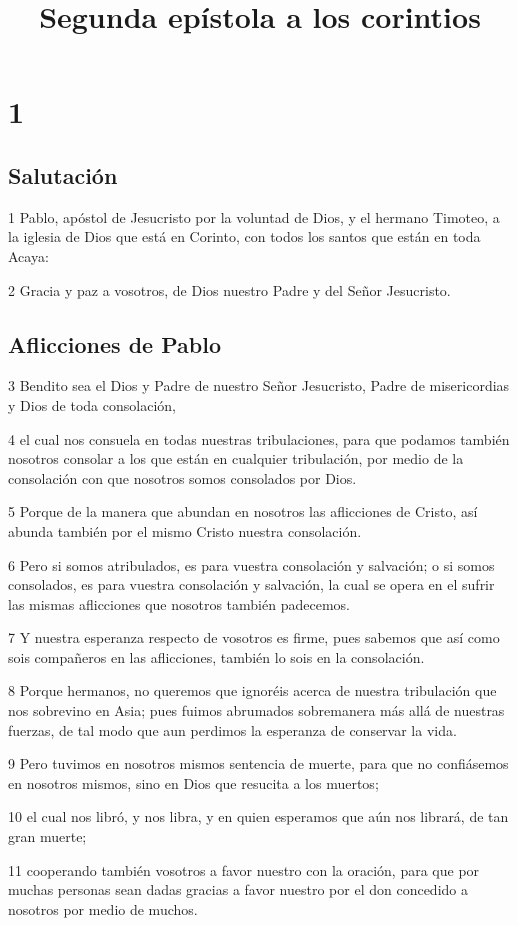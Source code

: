 
\title{Segunda epístola a los corintios}

\chapter{1}

\section*{Salutación}

\par 1 Pablo, apóstol de Jesucristo por la voluntad de Dios, y el hermano Timoteo, a la iglesia de Dios que está en Corinto, con todos los santos que están en toda Acaya:
\par 2 Gracia y paz a vosotros, de Dios nuestro Padre y del Señor Jesucristo.

\section*{Aflicciones de Pablo}

\par 3 Bendito sea el Dios y Padre de nuestro Señor Jesucristo, Padre de misericordias y Dios de toda consolación,
\par 4 el cual nos consuela en todas nuestras tribulaciones, para que podamos también nosotros consolar a los que están en cualquier tribulación, por medio de la consolación con que nosotros somos consolados por Dios.
\par 5 Porque de la manera que abundan en nosotros las aflicciones de Cristo, así abunda también por el mismo Cristo nuestra consolación.
\par 6 Pero si somos atribulados, es para vuestra consolación y salvación; o si somos consolados, es para vuestra consolación y salvación, la cual se opera en el sufrir las mismas aflicciones que nosotros también padecemos.
\par 7 Y nuestra esperanza respecto de vosotros es firme, pues sabemos que así como sois compañeros en las aflicciones, también lo sois en la consolación.
\par 8 Porque hermanos, no queremos que ignoréis acerca de nuestra tribulación que nos sobrevino en Asia; pues fuimos abrumados sobremanera más allá de nuestras fuerzas, de tal modo que aun perdimos la esperanza de conservar la vida.
\par 9 Pero tuvimos en nosotros mismos sentencia de muerte, para que no confiásemos en nosotros mismos, sino en Dios que resucita a los muertos;
\par 10 el cual nos libró, y nos libra, y en quien esperamos que aún nos librará, de tan gran muerte;
\par 11 cooperando también vosotros a favor nuestro con la oración, para que por muchas personas sean dadas gracias a favor nuestro por el don concedido a nosotros por medio de muchos.


